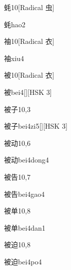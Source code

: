 \begin{entry}{蚝}{10}[Radical 虫]
  \begin{phonetics}{蚝}{hao2}
  \end{phonetics}
\end{entry}

\begin{entry}{袖}{10}[Radical 衣]
  \begin{phonetics}{袖}{xiu4}
  \end{phonetics}
\end{entry}

\begin{entry}{被}{10}[Radical 衣]
  \begin{phonetics}{被}{bei4}[][HSK 3]
  \end{phonetics}
\end{entry}

\begin{entry}{被子}{10,3}
  \begin{phonetics}{被子}{bei4zi5}[][HSK 3]
  \end{phonetics}
\end{entry}

\begin{entry}{被动}{10,6}
  \begin{phonetics}{被动}{bei4dong4}
  \end{phonetics}
\end{entry}

\begin{entry}{被告}{10,7}
  \begin{phonetics}{被告}{bei4gao4}
  \end{phonetics}
\end{entry}

\begin{entry}{被单}{10,8}
  \begin{phonetics}{被单}{bei4dan1}
  \end{phonetics}
\end{entry}

\begin{entry}{被迫}{10,8}
  \begin{phonetics}{被迫}{bei4po4}
  \end{phonetics}
\end{entry}

